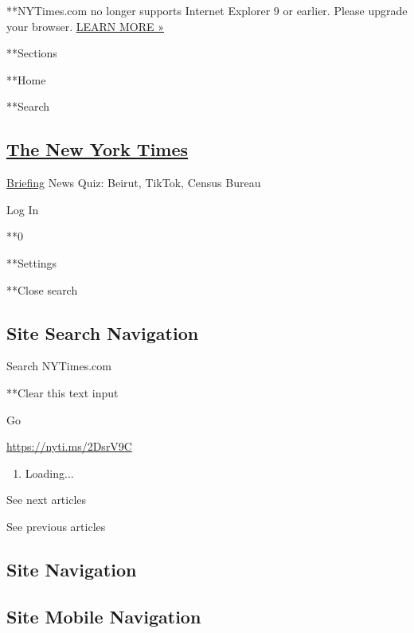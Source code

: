 **NYTimes.com no longer supports Internet Explorer 9 or earlier. Please
upgrade your browser.
\href{http://www.nytimes.com/content/help/site/ie9-support.html}{LEARN
MORE »}

**Sections

**Home

**Search

\hypertarget{the-new-york-times}{%
\subsection{\texorpdfstring{\href{http://www.nytimes.com/}{The New York
Times}}{The New York Times}}\label{the-new-york-times}}

\href{/interactive/2018/briefing/global-morning-briefing-newsletter-signup.html}{Briefing}
\textbar{}News Quiz: Beirut, TikTok, Census Bureau

Log In

**0

**Settings

**Close search

\hypertarget{site-search-navigation}{%
\subsection{Site Search Navigation}\label{site-search-navigation}}

Search NYTimes.com

**Clear this text input

Go

\href{https://nyti.ms/2DsrV9C}{https://nyti.ms/2DsrV9C}

\begin{enumerate}
\def\labelenumi{\arabic{enumi}.}
\item
  Loading...
\end{enumerate}

See next articles

See previous articles

\hypertarget{site-navigation}{%
\subsection{Site Navigation}\label{site-navigation}}

\hypertarget{site-mobile-navigation}{%
\subsection{Site Mobile Navigation}\label{site-mobile-navigation}}

